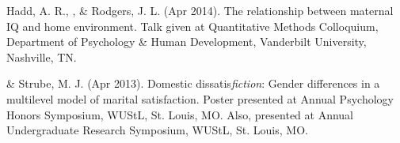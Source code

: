 \item Hadd, A. R., \meb, \& Rodgers, J. L. (Apr 2014). The relationship between maternal IQ and home environment. Talk given at Quantitative Methods Colloquium, Department of Psychology \& Human Development, Vanderbilt University, Nashville, TN.
\item\meb \& Strube, M. J. (Apr 2013). Domestic dissatis{\em fiction}: Gender differences in a multilevel model of marital satisfaction. Poster presented at Annual Psychology Honors Symposium, WUStL, St. Louis, MO. Also, presented at Annual Undergraduate Research Symposium, WUStL, St. Louis, MO.
\smallskip\\
